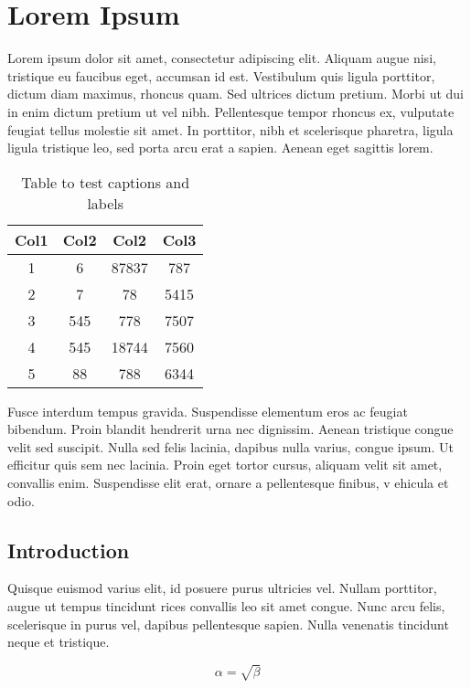 \chapter{Lorem Ipsum}

Lorem ipsum dolor sit amet, consectetur adipiscing elit. Aliquam augue nisi,
tristique eu faucibus eget, accumsan id est. Vestibulum quis ligula porttitor,
dictum diam maximus, rhoncus quam. Sed ultrices dictum pretium. Morbi ut dui in
enim dictum pretium ut vel nibh. Pellentesque tempor rhoncus ex, vulputate
feugiat tellus molestie sit amet. In porttitor, nibh et scelerisque pharetra,
ligula ligula tristique leo, sed porta arcu erat a sapien. Aenean eget sagittis
lorem.

\begin{table}[h!]
    \centering
    \begin{tabular}{|c c c c|}
        \hline
        Col1 & Col2 & Col2 & Col3 \\
        \hline
        1 & 6 & 87837 & 787 \\
        2 & 7 & 78 & 5415 \\
        3 & 545 & 778 & 7507 \\
        4 & 545 & 18744 & 7560 \\
        5 & 88 & 788 & 6344 \\
        \hline
    \end{tabular}
    \caption{Table to test captions and labels}
    \label{table}
\end{table}

Fusce interdum tempus gravida. Suspendisse elementum eros ac feugiat bibendum.
Proin blandit hendrerit urna nec dignissim. Aenean tristique congue velit sed
suscipit. Nulla sed felis lacinia, dapibus nulla varius, congue ipsum. Ut
efficitur quis sem nec lacinia. Proin eget tortor cursus, aliquam velit sit
amet, convallis enim. Suspendisse elit erat, ornare a pellentesque finibus, v
ehicula et odio.

\section{Introduction}

Quisque euismod varius elit, id posuere purus ultricies vel. Nullam porttitor,
augue ut tempus tincidunt rices convallis leo sit amet congue. Nunc arcu felis,
scelerisque in purus vel, dapibus pellentesque sapien. Nulla venenatis
tincidunt neque et tristique.

\begin{equation}
    \label{simple_equation}
    \alpha = \sqrt{ \beta }
\end{equation}
